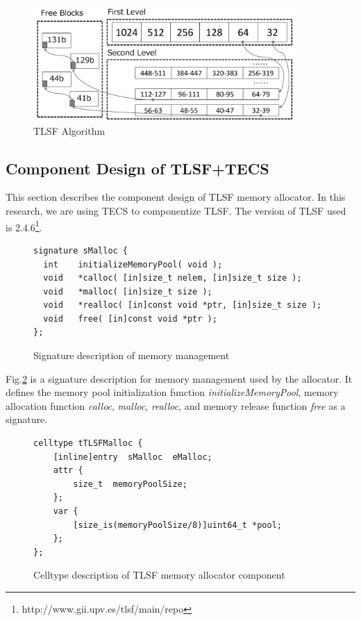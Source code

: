 \documentclass[a4j,12pt,oneside,openany,english]{jsbook}
\begin{document}
\begin{figure}[t]
    \centering
    \includegraphics[width=10cm,clip]{figure/TLSF.pdf}
    \caption{TLSF Algorithm}
    \label{fig:TLSF}
\end{figure}


\subsection{Component Design of TLSF+TECS}

This section describes the component design of TLSF memory allocator.
In this research, we are using TECS to componentize TLSF.
The version of TLSF used is 2.4.6\footnote{http://www.gii.upv.es/tlsf/main/repo}.

\begin{figure}[t]
\centering
\begin{lstlisting}
signature sMalloc {
  int    initializeMemoryPool( void );
  void   *calloc( [in]size_t nelem, [in]size_t size );
  void   *malloc( [in]size_t size );
  void   *realloc( [in]const void *ptr, [in]size_t size );
  void   free( [in]const void *ptr );
};
\end{lstlisting}
\caption{Signature description of memory management}  
\label{src:TLSFSignature}
\end{figure}

Fig.\ref{src:TLSFSignature} is a signature description for memory management used by the allocator.
It defines the memory pool initialization function {\it initializeMemoryPool}, memory allocation function {\it calloc}, {\it malloc}, {\it realloc}, and memory release function {\it free} as a signature.

\begin{figure}[t]
\centering
\begin{lstlisting}
celltype tTLSFMalloc {
    [inline]entry  sMalloc  eMalloc;
    attr {
        size_t  memoryPoolSize;
    };
    var {
        [size_is(memoryPoolSize/8)]uint64_t *pool;
    };
};
\end{lstlisting}
\caption{Celltype description of TLSF memory allocator component}  
\label{src:TLSFCelltype}
\end{figure}
\end{document}
